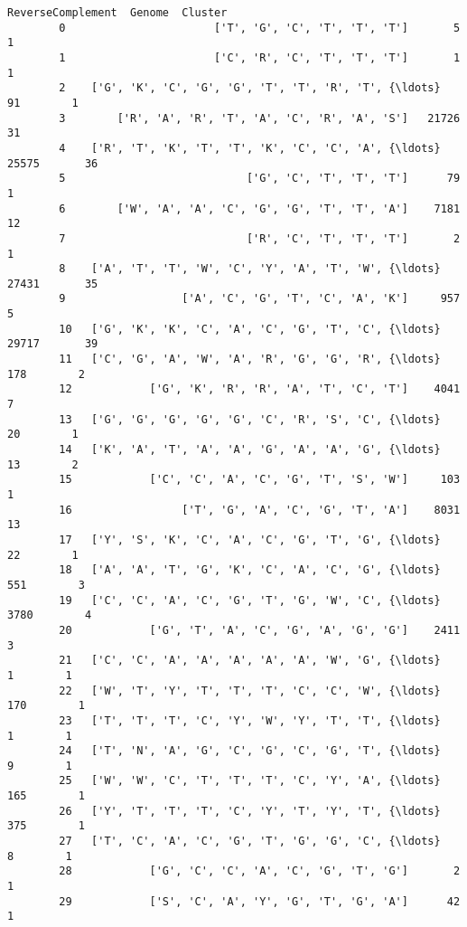 \documentclass[11pt]{article}
\begin{document}
\begin{Verbatim}[commandchars=\\\{\}]
                                             ReverseComplement  Genome  Cluster  
        0                       ['T', 'G', 'C', 'T', 'T', 'T']       5        1  
        1                       ['C', 'R', 'C', 'T', 'T', 'T']       1        1  
        2    ['G', 'K', 'C', 'G', 'G', 'T', 'T', 'R', 'T', {\ldots}      91        1  
        3        ['R', 'A', 'R', 'T', 'A', 'C', 'R', 'A', 'S']   21726       31  
        4    ['R', 'T', 'K', 'T', 'T', 'K', 'C', 'C', 'A', {\ldots}   25575       36  
        5                            ['G', 'C', 'T', 'T', 'T']      79        1  
        6        ['W', 'A', 'A', 'C', 'G', 'G', 'T', 'T', 'A']    7181       12  
        7                            ['R', 'C', 'T', 'T', 'T']       2        1  
        8    ['A', 'T', 'T', 'W', 'C', 'Y', 'A', 'T', 'W', {\ldots}   27431       35  
        9                  ['A', 'C', 'G', 'T', 'C', 'A', 'K']     957        5  
        10   ['G', 'K', 'K', 'C', 'A', 'C', 'G', 'T', 'C', {\ldots}   29717       39  
        11   ['C', 'G', 'A', 'W', 'A', 'R', 'G', 'G', 'R', {\ldots}     178        2  
        12            ['G', 'K', 'R', 'R', 'A', 'T', 'C', 'T']    4041        7  
        13   ['G', 'G', 'G', 'G', 'G', 'C', 'R', 'S', 'C', {\ldots}      20        1  
        14   ['K', 'A', 'T', 'A', 'A', 'G', 'A', 'A', 'G', {\ldots}      13        2  
        15            ['C', 'C', 'A', 'C', 'G', 'T', 'S', 'W']     103        1  
        16                 ['T', 'G', 'A', 'C', 'G', 'T', 'A']    8031       13  
        17   ['Y', 'S', 'K', 'C', 'A', 'C', 'G', 'T', 'G', {\ldots}      22        1  
        18   ['A', 'A', 'T', 'G', 'K', 'C', 'A', 'C', 'G', {\ldots}     551        3  
        19   ['C', 'C', 'A', 'C', 'G', 'T', 'G', 'W', 'C', {\ldots}    3780        4  
        20            ['G', 'T', 'A', 'C', 'G', 'A', 'G', 'G']    2411        3  
        21   ['C', 'C', 'A', 'A', 'A', 'A', 'A', 'W', 'G', {\ldots}       1        1  
        22   ['W', 'T', 'Y', 'T', 'T', 'T', 'C', 'C', 'W', {\ldots}     170        1  
        23   ['T', 'T', 'T', 'C', 'Y', 'W', 'Y', 'T', 'T', {\ldots}       1        1  
        24   ['T', 'N', 'A', 'G', 'C', 'G', 'C', 'G', 'T', {\ldots}       9        1  
        25   ['W', 'W', 'C', 'T', 'T', 'T', 'C', 'Y', 'A', {\ldots}     165        1  
        26   ['Y', 'T', 'T', 'T', 'C', 'Y', 'T', 'Y', 'T', {\ldots}     375        1  
        27   ['T', 'C', 'A', 'C', 'G', 'T', 'G', 'G', 'C', {\ldots}       8        1  
        28            ['G', 'C', 'C', 'A', 'C', 'G', 'T', 'G']       2        1  
        29            ['S', 'C', 'A', 'Y', 'G', 'T', 'G', 'A']      42        1  

\end{Verbatim}
\end{document}
